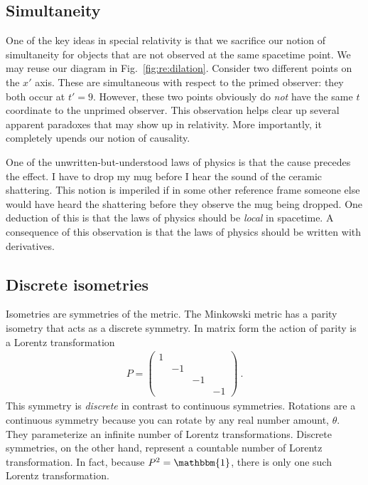 \documentclass[12pt, oneside]{report}    %
\begin{document}
\begin{subappendices}
\subsection{%
Simultaneity}
\label{eq:simultaneity}

One of the key ideas in special relativity is that we sacrifice our notion of simultaneity for objects that are not observed at the same spacetime point. We may reuse our diagram in Fig.~\ref{fig:re:dilation}. Consider two different points on the $x'$ axis. These are simultaneous with respect to the primed observer: they both occur at $t'=9$. However, these two points  obviously do \emph{not} have the same $t$ coordinate to the unprimed observer. This observation helps clear up several apparent paradoxes that may show up in relativity. More importantly, it completely upends our notion of causality.

One of the unwritten-but-understood laws of physics is that the cause precedes the effect. I have to drop my mug before I hear the sound of the ceramic shattering. This notion is imperiled if in some other reference frame someone else would have heard the shattering before they observe the mug being dropped. One deduction of this is that the laws of physics should be \emph{local} in spacetime. A consequence of this observation is that the laws of physics should be written with derivatives.


\subsection{%
Discrete isometries}

Isometries are symmetries of the metric.
% 
The Minkowski metric has a parity isometry that acts as a discrete symmetry. In matrix form the action of parity is a Lorentz transformation
\begin{align}
    P = \begin{pmatrix}
        1 & & &\\
         & -1& &\\
         & & -1 &\\
         & & & -1
    \end{pmatrix}\ .
\end{align}
This symmetry is \emph{discrete} in contrast to continuous symmetries. Rotations are a continuous symmetry because you can rotate by any real number amount, $\theta$. They parameterize an infinite number of Lorentz transformations. Discrete symmetries, on the other hand, represent a countable number of Lorentz transformation. In fact, because $P^2 = \mathbbm{1}$, there is only one such Lorentz transformation. 


\end{subappendices}
\end{document}
